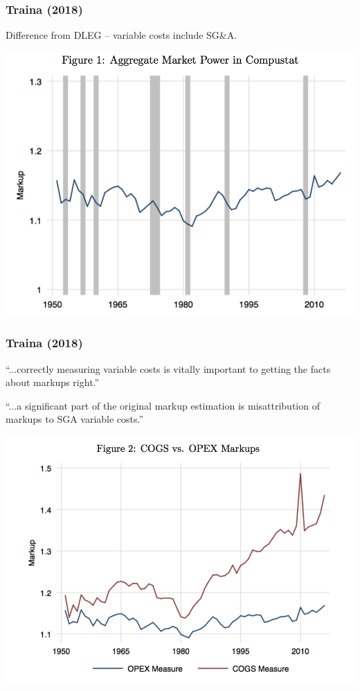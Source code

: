 \documentclass[11pt, aspectratio=169]{beamer}
\newenvironment{wideitemize}{\itemize\addtolength{\itemsep}{10pt}}{\enditemize}
\begin{document}
\begin{frame}[c]\frametitle{Traina (2018)}
    \begin{wideitemize}
    	\item Difference from DLEG -- variable costs include SG\&A.
    \end{wideitemize}
    
    \centering
    \includegraphics[scale=.6]{Traina1.png}


\end{frame}

\begin{frame}[c]\frametitle{Traina (2018)}
    \begin{wideitemize}
    	\item ``...correctly measuring variable costs is vitally important to getting the facts about markups right.''
    	\item ``...a significant part of the original markup estimation is misattribution of markups to SGA variable costs.''
    \end{wideitemize}
    
    \centering
    \includegraphics[scale=.55]{Traina2.png}


\end{frame}
\end{document}
